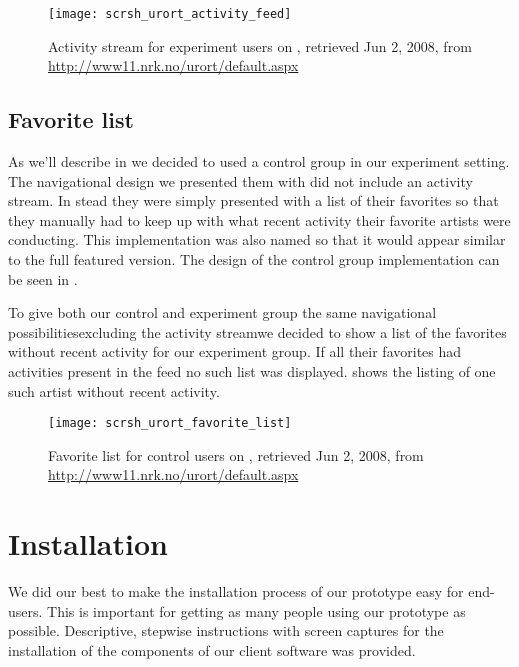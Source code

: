 \begin{figure}
  \texttt{[image: scrsh\_urort\_activity\_feed]}
  \caption[\urort{} Activity Stream]{
    Activity stream for experiment users on \urort{},
    retrieved Jun 2, 2008, from
    \url{http://www11.nrk.no/urort/default.aspx}
  }
  \label{figure:scrsh.urort.activity.feed}
\end{figure}

\subsection{Favorite list}
\label{section:implementation.design.favorite.list}

As we'll describe in
we decided to used a control group in our experiment setting. The navigational
design we presented them with did not include an activity stream. In stead
they
were simply presented with a list of their favorites so that they manually had
to keep up with what recent activity their favorite artists were conducting.
This implementation was also named \latest{} so that it would appear similar
to the full featured version.
The design of the control group implementation can be seen in
.

To give both our control and experiment group the same navigational
possibilities\dash{}excluding the activity stream\dash{}we decided to show a
list of the favorites without recent activity for our experiment group. If all
their favorites had activities present in the feed no such list was displayed.
 shows the listing of one such artist
without recent activity.

\begin{figure}
  \texttt{[image: scrsh\_urort\_favorite\_list]}
  \caption[\urort{} Favorite List]{
    Favorite list for control users on \urort{},
    retrieved Jun 2, 2008, from
    \url{http://www11.nrk.no/urort/default.aspx}
  }
  \label{figure:scrsh.urort.favorite.list}
\end{figure}

\section{Installation}

We did our best to make the installation process of our prototype easy
for end-users. This is important for getting as many people using our
prototype as possible.
Descriptive, stepwise instructions with screen captures for the installation of
the components of our client software was provided.

